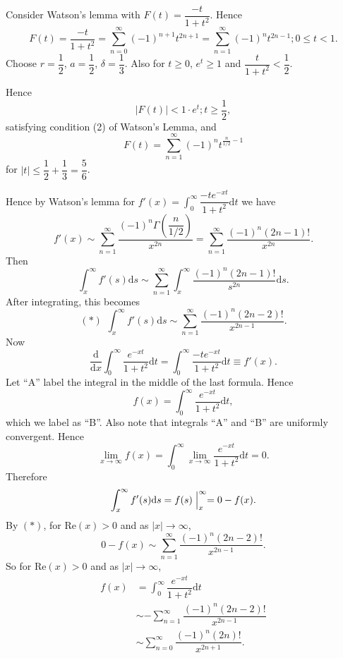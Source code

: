 \begin{solution}
Consider Watson's lemma with $F(t) = \dfrac{-t}{1+t^2}$. Hence
$$F(t) = \dfrac{-t}{1+t^2} = \displaystyle\sum_{n=0}^{\infty} (-1)^{n+1} t^{2n+1} = \displaystyle\sum_{n=1}^{\infty} (-1)^n t^{2n-1}; 0 \leq t < 1.$$
Choose $r = \dfrac{1}{2}$, $a = \dfrac{1}{2}$, $\delta = \dfrac{1}{3}$. Also for $t \geq 0$, $e^t \geq 1$ and $\dfrac{t}{1+t^2} < \dfrac{1}{2}$. 

Hence
$$|F(t)| < 1 \cdot e^t; t \geq \dfrac{1}{2},$$
satisfying condition (2) of Watson's Lemma, and
$$F(t) = \displaystyle\sum_{n=1}^{\infty} (-1)^n t^{\frac{n}{1/2}-1}$$
for $|t| \leq \dfrac{1}{2} + \dfrac{1}{3} = \dfrac{5}{6}$.

Hence by Watson's lemma for $f'(x) = \displaystyle\int_0^{\infty} \dfrac{-te^{-xt}}{1+t^2} \mathrm{d}t$ we have
$$f'(x) \sim \displaystyle\sum_{n=1}^{\infty} \dfrac{(-1)^n \Gamma \left( \dfrac{n}{1/2} \right)}{x^{2n}} = \displaystyle\sum_{n=1}^{\infty} \dfrac{(-1)^n (2n-1)!}{x^{2n}}.$$
Then
$$\displaystyle\int_x^{\infty} f'(s) \mathrm{d}s \sim \displaystyle\sum_{n=1}^{\infty} \displaystyle\int_x^{\infty} \dfrac{(-1)^n(2n-1)!}{s^{2n}} \mathrm{d}s.$$
After integrating, this becomes
$$(*) \hspace{5pt} \displaystyle\int_x^{\infty} f'(s) \mathrm{d}s \sim \displaystyle\sum_{n=1}^{\infty} \dfrac{(-1)^n (2n-2)!}{x^{2n-1}}.$$
Now
$$\dfrac{\mathrm{d}}{\mathrm{d}x} \displaystyle\int_0^{\infty} \dfrac{e^{-xt}}{1+t^2}\mathrm{d}t = \displaystyle\int_0^{\infty} \dfrac{-t e^{-xt}}{1+t^2} \mathrm{d}t \equiv f'(x).$$
Let \textquotedblleft A\textquotedblright {} label the integral in the middle of the last formula. Hence 
$$f(x) = \displaystyle\int_0^{\infty} \dfrac{e^{-xt}}{1+t^2} \mathrm{d}t,$$
which we label as \textquotedblleft B\textquotedblright.
Also note that integrals \textquotedblleft A\textquotedblright {} and \textquotedblleft B\textquotedblright {} are uniformly convergent. Hence
$$\displaystyle\lim_{x \rightarrow \infty} f(x) = \displaystyle\int_0^{\infty} \displaystyle\lim_{x \rightarrow \infty} \dfrac{e^{-xt}}{1+t^2} \mathrm{d}t = 0.$$
Therefore
$$\displaystyle\int_x^{\infty} f'(s) \mathrm{d}s = f(s) \Bigm| _x^{\infty} = 0 - f(x).$$
By $(*)$, for $\mathrm{Re}(x) > 0$ and as $|x| \rightarrow \infty$,
$$0 - f(x) \sim \displaystyle\sum_{n=1}^{\infty} \dfrac{(-1)^n (2n-2)!}{x^{2n-1}}.$$
So for $\mathrm{Re}(x)>0$ and as $|x| \rightarrow \infty$,
$$\begin{array}{ll}
f(x) &= \displaystyle\int_0^{\infty} \dfrac{e^{-xt}}{1+t^2} \mathrm{d}t \\
&\sim - \displaystyle\sum_{n=1}^{\infty} \dfrac{(-1)^n(2n-2)!}{x^{2n-1}} \\
&\sim \displaystyle\sum_{n=0}^{\infty} \dfrac{(-1)^n (2n)!}{x^{2n+1}}.
\end{array}$$
\end{solution}
